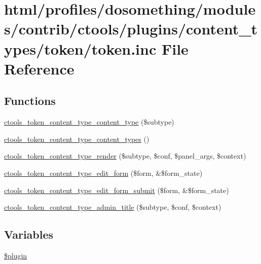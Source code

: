 \hypertarget{profiles_2dosomething_2modules_2contrib_2ctools_2plugins_2content__types_2token_2token_8inc}{
\section{html/profiles/dosomething/modules/contrib/ctools/plugins/content\_\-types/token/token.inc File Reference}
\label{profiles_2dosomething_2modules_2contrib_2ctools_2plugins_2content__types_2token_2token_8inc}
}
\subsection*{Functions}
\begin{DoxyCompactItemize}
\item 
\hyperlink{profiles_2dosomething_2modules_2contrib_2ctools_2plugins_2content__types_2token_2token_8inc_a354dcbc5f21429cb31aea2c89389461d}{ctools\_\-token\_\-content\_\-type\_\-content\_\-type} (\$subtype)
\item 
\hyperlink{profiles_2dosomething_2modules_2contrib_2ctools_2plugins_2content__types_2token_2token_8inc_a339cc78432c8b1a76bef18ec35a9ae7b}{ctools\_\-token\_\-content\_\-type\_\-content\_\-types} ()
\item 
\hyperlink{profiles_2dosomething_2modules_2contrib_2ctools_2plugins_2content__types_2token_2token_8inc_a1f607523b748a43a0addb1dc3cd85823}{ctools\_\-token\_\-content\_\-type\_\-render} (\$subtype, \$conf, \$panel\_\-args, \$context)
\item 
\hyperlink{profiles_2dosomething_2modules_2contrib_2ctools_2plugins_2content__types_2token_2token_8inc_a140f13c747191e1847868eac314678ba}{ctools\_\-token\_\-content\_\-type\_\-edit\_\-form} (\$form, \&\$form\_\-state)
\item 
\hyperlink{profiles_2dosomething_2modules_2contrib_2ctools_2plugins_2content__types_2token_2token_8inc_a37930c4b24c45b1463e0659a50e8786b}{ctools\_\-token\_\-content\_\-type\_\-edit\_\-form\_\-submit} (\$form, \&\$form\_\-state)
\item 
\hyperlink{profiles_2dosomething_2modules_2contrib_2ctools_2plugins_2content__types_2token_2token_8inc_acf7c27f3aec78e6b907806c2527263a2}{ctools\_\-token\_\-content\_\-type\_\-admin\_\-title} (\$subtype, \$conf, \$context)
\end{DoxyCompactItemize}
\subsection*{Variables}
\begin{DoxyCompactItemize}
\item 
\hyperlink{profiles_2dosomething_2modules_2contrib_2ctools_2plugins_2content__types_2token_2token_8inc_ada8a7130088351710bb02ed622d6bf65}{\$plugin}
\end{DoxyCompactItemize}


